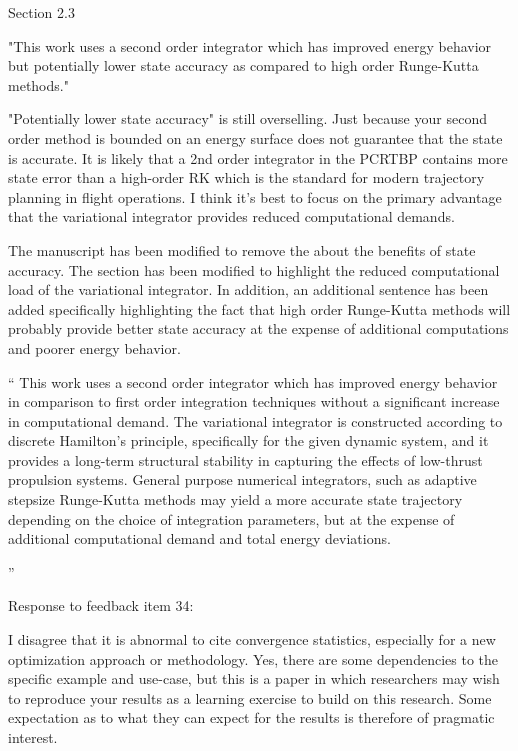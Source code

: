 \documentclass[11pt]{article}
\newenvironment{correction}{\begin{list}{}{\setlength{\leftmargin}{1cm}\setlength{\rightmargin}{1cm}}\vspace{\parsep}\item[]``}{''\end{list}}
\begin{document}
\begin{itemize}
    \item 
        \begin{itshape}
            Section 2.3

            "This work uses a second order integrator which has improved energy behavior but potentially lower state accuracy as compared to high order Runge-Kutta methods."

            "Potentially lower state accuracy" is still overselling.  Just because your second order method is bounded on an energy surface does not guarantee that the state is accurate.  It is likely that a 2nd order integrator in the PCRTBP contains more state error than a high-order RK which is the standard for modern trajectory planning in flight operations.  I think it's best to focus on the primary advantage that the variational integrator provides reduced computational demands.
        \end{itshape}
    
    The manuscript has been modified to remove the about the benefits of state accuracy.
    The section has been modified to highlight the reduced computational load of the variational integrator.
    In addition, an additional sentence has been added specifically highlighting the fact that high order Runge-Kutta methods will probably provide better state accuracy at the expense of additional computations and poorer energy behavior.
    
    \begin{correction}
        This work uses a second order integrator which has improved energy behavior in comparison to first order integration techniques without a significant increase in computational demand.
        The variational integrator is constructed according to discrete Hamilton's principle, specifically for the given dynamic system, and it provides a long-term structural stability in capturing the effects of low-thrust propulsion systems. 
        General purpose numerical integrators, such as adaptive stepsize Runge-Kutta methods may yield a more accurate state trajectory depending on the choice of integration parameters, but at the expense of additional computational demand and total energy deviations.

    \end{correction}
    \item \begin{itshape}
            Response to feedback item 34:

            I disagree that it is abnormal to cite convergence statistics, especially for a new optimization approach or methodology.  Yes, there are some dependencies to the specific example and use-case, but this is a paper in which researchers may wish to reproduce your results as a learning exercise to build on this research.  Some expectation as to what they can expect for the results is therefore of pragmatic interest.


\end{itshape}
\end{itemize}
\end{document}
